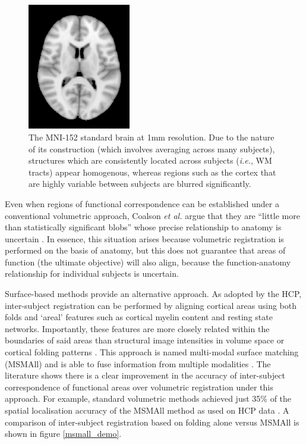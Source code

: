 \documentclass[12pt]{report}
\begin{document}
\begin{figure}[h]
\centering
\includegraphics[width = 0.4\textwidth]{mni152.png}
\caption{The MNI-152 standard brain at 1mm resolution. Due to the nature of its construction (which involves averaging across many subjects), structures which are consistently located across subjects (\textit{i.e.}, WM tracts) appear homogenous, whereas regions such as the cortex that are highly variable between subjects are blurred significantly.}
\label{mni152}
\end{figure}

Even when regions of functional correspondence can be established under a conventional volumetric approach, Coalson \textit{et al.} argue that they are ``little more than statistically significant blobs” whose precise relationship to anatomy is uncertain \cite{Coalson2017}. In essence, this situation arises because volumetric registration is performed on the basis of anatomy, but this does not guarantee that areas of function (the ultimate objective) will also align, because the function-anatomy relationship for individual subjects is uncertain. 

Surface-based methods provide an alternative approach. As adopted by the HCP, inter-subject registration can be performed by aligning cortical areas using both folds and `areal' features such as cortical myelin content and resting state networks. Importantly, these features are more closely related within the boundaries of said areas than structural image intensities in volume space \cite{Glasser2016a} or cortical folding patterns \cite{Robinson2014, Robinson2018}. This approach is named multi-modal surface matching (MSMAll) and is able to fuse information from multiple modalities \cite{Robinson2013}. The literature shows there is a clear improvement in the accuracy of inter-subject correspondence of functional areas over volumetric registration under this approach. For example, standard volumetric methods achieved just 35\% of the spatial localisation accuracy of the MSMAll method as used on HCP data \cite{Coalson2017}. A comparison of inter-subject registration based on folding alone versus MSMAll is shown in figure \ref{msmall_demo}.
\end{document}

